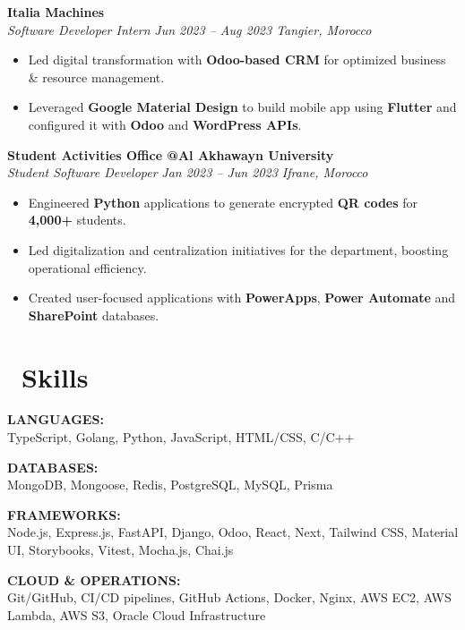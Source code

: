 \documentclass[a4paper, 10pt]{article}
\begin{document}
\textbf{Italia Machines} \\
\textit{Software Developer \textbar{} Intern} \hfill \textit{Jun 2023 -- Aug 2023 \textbar{} Tangier, Morocco}
\begin{itemize}[leftmargin=10pt, itemsep=-1pt, topsep=2pt]
\item Led digital transformation with \textbf{Odoo-based CRM} for optimized business \& resource management.
\item Leveraged \textbf{Google Material Design} to build mobile app using \textbf{Flutter} and configured it with \textbf{Odoo} and \textbf{WordPress APIs}.
\end{itemize}

\textbf{Student Activities Office @Al Akhawayn University} \\
\textit{Student Software Developer} \hfill \textit{Jan 2023 -- Jun 2023 \textbar{} Ifrane, Morocco}
\begin{itemize}[leftmargin=10pt, itemsep=-1pt, topsep=2pt]
\item Engineered \textbf{Python} applications to generate encrypted \textbf{QR codes} for \textbf{4,000+} students.
\item Led digitalization and centralization initiatives for the department, boosting operational efficiency.
\item Created user-focused applications with \textbf{PowerApps}, \textbf{Power Automate} and \textbf{SharePoint} databases.
\end{itemize}

\section{\faBrain\ Skills}
\begin{minipage}[t]{0.48\textwidth}
\textbf{LANGUAGES:} \\
TypeScript, Golang, Python, JavaScript, HTML/CSS, C/C++
\end{minipage}
\hfill
\begin{minipage}[t]{0.48\textwidth}
\textbf{DATABASES:} \\
MongoDB, Mongoose, Redis, PostgreSQL, MySQL, Prisma
\end{minipage}

\vspace{3pt}

\begin{minipage}[t]{0.48\textwidth}
\textbf{FRAMEWORKS:} \\
Node.js, Express.js, FastAPI, Django, Odoo, React, Next, Tailwind CSS, Material UI, Storybooks, Vitest, Mocha.js, Chai.js
\end{minipage}
\hfill
\begin{minipage}[t]{0.48\textwidth}
\textbf{CLOUD \& OPERATIONS:} \\
Git/GitHub, CI/CD pipelines, GitHub Actions, Docker, Nginx, AWS EC2, AWS Lambda, AWS S3, Oracle Cloud Infrastructure
\end{minipage}
\end{document}

